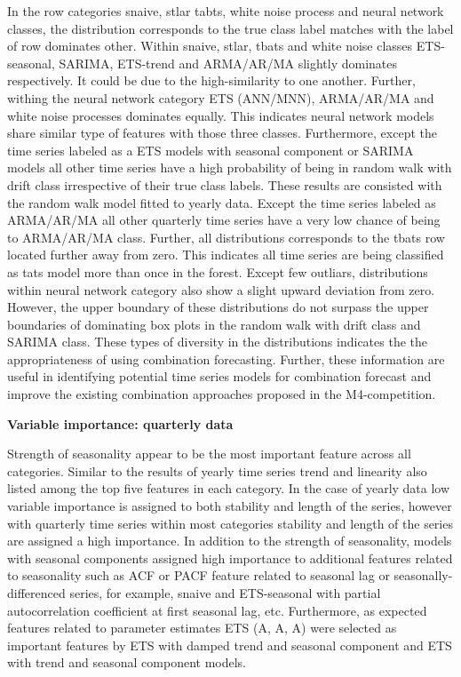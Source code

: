 \documentclass[11pt,a4paper,]{article}
\theoremstyle{definition}
\theoremstyle{definition}
\theoremstyle{definition}
\theoremstyle{remark}
\begin{document}
In the row categories snaive, stlar tabts, white noise process and
neural network classes, the distribution corresponds to the true class
label matches with the label of row dominates other. Within snaive,
stlar, tbats and white noise classes ETS-seasonal, SARIMA, ETS-trend and
ARMA/AR/MA slightly dominates respectively. It could be due to the
high-similarity to one another. Further, withing the neural network
category ETS (ANN/MNN), ARMA/AR/MA and white noise processes dominates
equally. This indicates neural network models share similar type of
features with those three classes. Furthermore, except the time series
labeled as a ETS models with seasonal component or SARIMA models all
other time series have a high probability of being in random walk with
drift class irrespective of their true class labels. These results are
consisted with the random walk model fitted to yearly data. Except the
time series labeled as ARMA/AR/MA all other quarterly time series have a
very low chance of being to ARMA/AR/MA class. Further, all distributions
corresponds to the tbats row located further away from zero. This
indicates all time series are being classified as tats model more than
once in the forest. Except few outliars, distributions within neural
network category also show a slight upward deviation from zero. However,
the upper boundary of these distributions do not surpass the upper
boundaries of dominating box plots in the random walk with drift class
and SARIMA class. These types of diversity in the distributions
indicates the the appropriateness of using combination forecasting.
Further, these information are useful in identifying potential time
series models for combination forecast and improve the existing
combination approaches proposed in the M4-competition.

\textbf{Variable importance: quarterly data}

Strength of seasonality appear to be the most important feature across
all categories. Similar to the results of yearly time series trend and
linearity also listed among the top five features in each category. In
the case of yearly data low variable importance is assigned to both
stability and length of the series, however with quarterly time series
within most categories stability and length of the series are assigned a
high importance. In addition to the strength of seasonality, models with
seasonal components assigned high importance to additional features
related to seasonality such as ACF or PACF feature related to seasonal
lag or seasonally-differenced series, for example, snaive and
ETS-seasonal with partial autocorrelation coefficient at first seasonal
lag, etc. Furthermore, as expected features related to parameter
estimates ETS (A, A, A) were selected as important features by ETS with
damped trend and seasonal component and ETS with trend and seasonal
component models.
\end{document}
